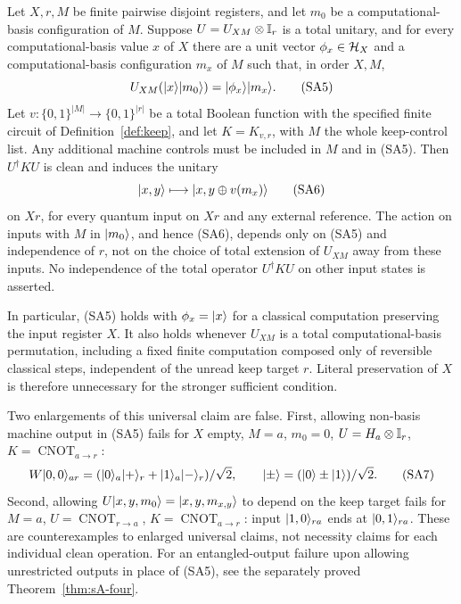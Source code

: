 \begin{theorem}
\label{thm:sA-classical}
Let $X,r,M$ be finite pairwise disjoint registers, and let $m_0$ be a
computational-basis configuration of $M$. Suppose $U=U_{XM}\otimes\mathbb{I}_r$
is a total unitary, and for every computational-basis value $x$ of $X$
there are a unit vector $\phi_x\in\mathcal{H}_X$ and a computational-basis
configuration $m_x$ of $M$ such that, in order $X,M$,
\[
 U_{XM}(\lvert x\rangle\lvert m_0\rangle)=\lvert \phi_x\rangle\lvert m_x\rangle.          \tag{SA5}
\]
Let $v:\{0,1\}^{|M|}\to\{0,1\}^{|r|}$ be a total Boolean function
with the specified finite circuit of Definition~\ref{def:keep}, and
let $K=K_{v,r}$, with $M$ the whole keep-control list. Any additional
machine controls must be included in $M$ and in (SA5).
Then $U^\dagger KU$ is clean and induces the unitary
\[
 \lvert x,y\rangle\longmapsto\lvert x,y\oplus v(m_x)\rangle             \tag{SA6}
\]
on $Xr$, for every quantum input on $Xr$ and any external reference.
The action on inputs with $M$ in $\lvert m_0\rangle$, and hence (SA6),
depends only on (SA5) and independence of $r$, not on the choice of
total extension of $U_{XM}$ away from these inputs. No independence of
the total operator $U^\dagger KU$ on other input states is asserted.

In particular, (SA5) holds with $\phi_x=\lvert x\rangle$ for a classical
computation preserving the input register $X$. It also
holds whenever $U_{XM}$ is a total computational-basis permutation,
including a fixed finite computation composed only of reversible classical
steps, independent of the unread keep target $r$. Literal preservation
of $X$ is therefore unnecessary for the stronger sufficient condition.

Two enlargements of this universal claim are false. First, allowing
non-basis machine output in (SA5) fails for $X$ empty, $M=a$, $m_0=0$,
$U=H_a\otimes\mathbb{I}_r$, $K=\operatorname{CNOT}_{a\to r}$:
\[
 W\lvert 0,0\rangle_{ar}=
   (\lvert 0\rangle_a\lvert +\rangle_r+\lvert 1\rangle_a\lvert -\rangle_r)/\sqrt2,
 \qquad\lvert \pm\rangle=(\lvert 0\rangle\pm\lvert 1\rangle)/\sqrt2.                \tag{SA7}
\]
Second, allowing $U\lvert x,y,m_0\rangle=\lvert x,y,m_{x,y}\rangle$ to depend on the
keep target fails for $M=a$, $U=\operatorname{CNOT}_{r\to a}$,
$K=\operatorname{CNOT}_{a\to r}$: input $\lvert 1,0\rangle_{ra}$ ends at
$\lvert 0,1\rangle_{ra}$. These are counterexamples to enlarged universal
claims, not necessity claims for each individual clean operation.
For an entangled-output failure upon allowing unrestricted outputs in
place of (SA5), see the separately proved Theorem~\ref{thm:sA-four}.
\end{theorem}
